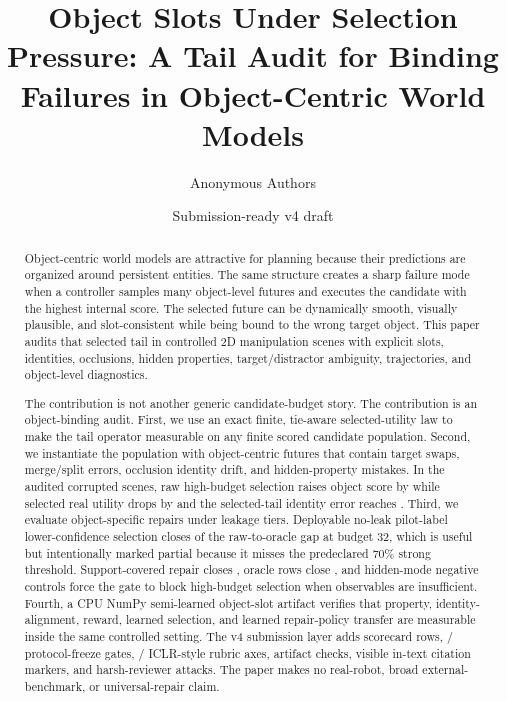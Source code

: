 \documentclass[10pt]{article}
\title{\vspace{-1.0em}Object Slots Under Selection Pressure: A Tail Audit for Binding Failures in Object-Centric World Models}
\author{Anonymous Authors}
\date{Submission-ready v4 draft}
\begin{document}
\maketitle

\begin{abstract}
Object-centric world models are attractive for planning because their predictions are organized around persistent entities. The same structure creates a sharp failure mode when a controller samples many object-level futures and executes the candidate with the highest internal score. The selected future can be dynamically smooth, visually plausible, and slot-consistent while being bound to the wrong target object. This paper audits that selected tail in controlled 2D manipulation scenes with explicit slots, identities, occlusions, hidden properties, target/distractor ambiguity, trajectories, and object-level diagnostics.

The contribution is not another generic candidate-budget story. The contribution is an object-binding audit. First, we use an exact finite, tie-aware selected-utility law to make the tail operator measurable on any finite scored candidate population. Second, we instantiate the population with object-centric futures that contain target swaps, merge/split errors, occlusion identity drift, and hidden-property mistakes. In the audited corrupted scenes, raw high-budget selection raises object score by \VThreeRawScoreGain{} while selected real utility drops by \VThreeRawUtilityDrop{} and the selected-tail identity error reaches \VThreeRawIdentityError{}. Third, we evaluate object-specific repairs under leakage tiers. Deployable no-leak pilot-label lower-confidence selection closes \VFourNoLeakClosure{} of the raw-to-oracle gap at budget 32, which is useful but intentionally marked partial because it misses the predeclared 70\% strong threshold. Support-covered repair closes \VFourSupportClosure{}, oracle rows close \VThreeOracleClosure{}, and hidden-mode negative controls force the gate to block high-budget selection when observables are insufficient. Fourth, a CPU NumPy semi-learned object-slot artifact verifies that property, identity-alignment, reward, learned selection, and learned repair-policy transfer are measurable inside the same controlled setting. The v4 submission layer adds \VFourSubmissionRows{} scorecard rows, \VFourProtocolGatesPassed{}/\VFourProtocolGates{} protocol-freeze gates, \VFourRubricAxesPassed{}/\VFourRubricAxes{} ICLR-style rubric axes, \VFourArtifactChecks{} artifact checks, \VFourCitationMarkers{} visible in-text citation markers, and \VFourAttackRounds{} harsh-reviewer attacks. The paper makes no real-robot, broad external-benchmark, or universal-repair claim.
\end{abstract}
\end{document}
